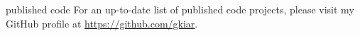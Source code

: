 \documentclass[]{friggeri-cv} %
\begin{document}


\subsubsection{}{published code}
For an up-to-date list of published code projects, please visit my GitHub profile at
\href{https://github.com/gkiar}{https://github.com/gkiar}.

\end{document}
